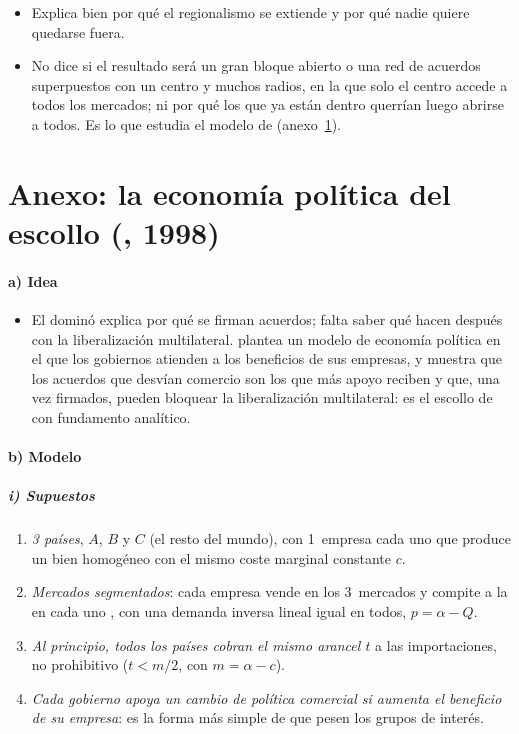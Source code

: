 \documentclass[11pt]{article}
\begin{document}
\begin{itemize}
\item Explica bien por qué el regionalismo se extiende y por qué nadie quiere quedarse fuera.
\item No dice si el resultado será un gran bloque abierto o una red de acuerdos superpuestos con un centro y muchos radios, en la que solo el centro accede a todos los mercados; ni por qué los que ya están dentro querrían luego abrirse a todos. Es lo que estudia el modelo de  (anexo~\ref{anexo:krishna}).
\end{itemize}

\section{Anexo: la economía política del escollo (, 1998)}\label{anexo:krishna}

\paragraph{a) Idea}

\begin{itemize}
\item El dominó explica por qué se firman acuerdos; falta saber qué hacen después con la liberalización multilateral. \textcite{Krishna1998} plantea un modelo de economía política en el que los gobiernos atienden a los beneficios de sus empresas, y muestra que los acuerdos que desvían comercio son los que más apoyo reciben y que, una vez firmados, pueden bloquear la liberalización multilateral: es el escollo de  con fundamento analítico.
\end{itemize}

\paragraph{b) Modelo}

\subparagraph{i) Supuestos}

\begin{enumerate}
\item \emph{3 países}, $A$, $B$ y $C$ (el resto del mundo), con 1~empresa cada uno que produce un bien homogéneo con el mismo coste marginal constante $c$.
\item \emph{Mercados segmentados}: cada empresa vende en los 3~mercados y compite a la  en cada uno , con una demanda inversa lineal igual en todos, $p=\alpha-Q$.
\item \emph{Al principio, todos los países cobran el mismo arancel $t$} a las importaciones, no prohibitivo ($t<m/2$, con $m=\alpha-c$).
\item \emph{Cada gobierno apoya un cambio de política comercial si aumenta el beneficio de su empresa}: es la forma más simple de que pesen los grupos de interés.
\end{enumerate}
\end{document}
